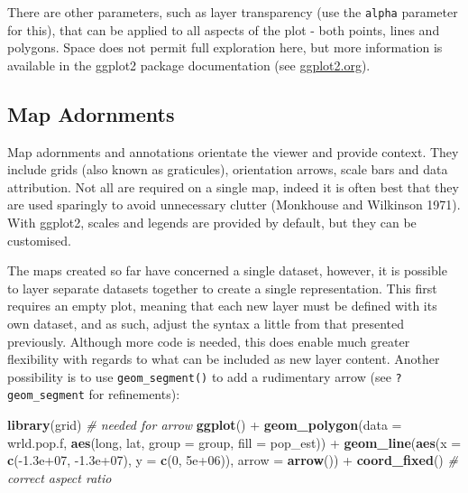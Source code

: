 \documentclass[]{article}
\newenvironment{Shaded}{}{}
\newcommand{\KeywordTok}[1]{\textcolor[rgb]{0.00,0.44,0.13}{\textbf{{#1}}}}
\newcommand{\DataTypeTok}[1]{\textcolor[rgb]{0.56,0.13,0.00}{{#1}}}
\newcommand{\DecValTok}[1]{\textcolor[rgb]{0.25,0.63,0.44}{{#1}}}
\newcommand{\FloatTok}[1]{\textcolor[rgb]{0.25,0.63,0.44}{{#1}}}
\newcommand{\CommentTok}[1]{\textcolor[rgb]{0.38,0.63,0.69}{\textit{{#1}}}}
\newcommand{\NormalTok}[1]{{#1}}
\begin{document}
There are other parameters, such as layer transparency (use the
\texttt{alpha} parameter for this), that can be applied to all aspects of
the plot - both points, lines and polygons. Space does not permit full
exploration here, but more information is available in the ggplot2
package documentation (see \href{http://ggplot2.org/}{ggplot2.org}).

\subsection{Map Adornments}


Map adornments and annotations orientate the viewer and provide context.
They include grids (also known as graticules), orientation arrows, scale
bars and data attribution. Not all are required on a single map, indeed
it is often best that they are used sparingly to avoid unnecessary
clutter (Monkhouse and Wilkinson 1971). With ggplot2, scales and legends
are provided by default, but they can be customised.

The maps created so far have concerned a single dataset, however, it is possible to layer
separate datasets together to create a single representation. This first requires an empty plot, meaning that each new layer must be defined with
its own dataset, and as such, adjust the syntax a little from that presented previously. Although more code is needed, this does enable
much greater flexibility with regards to what can be included as new
layer content. Another possibility is to use \texttt{geom\_segment()}
to add a rudimentary arrow (see \texttt{?geom\_segment} for
refinements):

\begin{Shaded}
\begin{Highlighting}[]
\KeywordTok{library}\NormalTok{(grid)  }\CommentTok{# needed for arrow}
\KeywordTok{ggplot}\NormalTok{() + }\KeywordTok{geom_polygon}\NormalTok{(}\DataTypeTok{data =} \NormalTok{wrld.pop.f, }\KeywordTok{aes}\NormalTok{(long, lat, }\DataTypeTok{group =} \NormalTok{group, }\DataTypeTok{fill =} \NormalTok{pop_est)) + }
    \KeywordTok{geom_line}\NormalTok{(}\KeywordTok{aes}\NormalTok{(}\DataTypeTok{x =} \KeywordTok{c}\NormalTok{(-}\FloatTok{1.3e+07}\NormalTok{, -}\FloatTok{1.3e+07}\NormalTok{), }\DataTypeTok{y =} \KeywordTok{c}\NormalTok{(}\DecValTok{0}\NormalTok{, }\FloatTok{5e+06}\NormalTok{)), }\DataTypeTok{arrow =} \KeywordTok{arrow}\NormalTok{()) + }
    \KeywordTok{coord_fixed}\NormalTok{()  }\CommentTok{# correct aspect ratio}
\end{Highlighting}
\end{Shaded}
\end{document}
